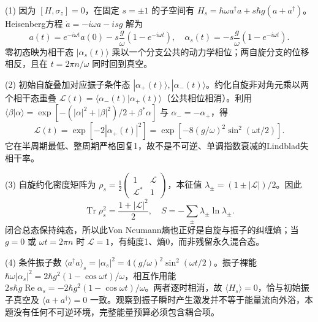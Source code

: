 (1) 因为 \([H,\sigma_z]=0\)，在固定 \(s=\pm1\) 的子空间有 \(H_s=\hbar\omega a^\dagger a+s\hbar g(a+a^\dagger)\)。Heisenberg方程 \(\dot a=-i\omega a-isg\) 解为
\[
a(t)=e^{-i\omega t}a(0)-s\frac g\omega(1-e^{-i\omega t}),
\quad\boxed{\alpha_s(t)=-s\frac g\omega(1-e^{-i\omega t})}.
\]
零初态映为相干态 \(|\alpha_s(t)\rangle\) 乘以一个分支公共的动力学相位；两自旋分支的位移相反，且在 \(t=2\pi n/\omega\) 同时回到真空。

(2) 初始自旋叠加对应振子条件态 \(|\alpha_+(t)\rangle,|\alpha_-(t)\rangle\)。约化自旋非对角元乘以两个相干态重叠 \(\mathcal L(t)=\langle\alpha_-(t)|\alpha_+(t)\rangle\)（公共相位相消）。利用 \(\langle\beta|\alpha\rangle=\exp[-(|\alpha|^2+|\beta|^2)/2+\beta^*\alpha]\) 与 \(\alpha_-=-\alpha_+\)，得
\[
\boxed{\mathcal L(t)=\exp[-2|\alpha_+(t)|^2]
=\exp[-8(g/\omega)^2\sin^2(\omega t/2)]}.
\]
它在半周期最低、整周期严格回复1，故不是不可逆、单调指数衰减的Lindblad失相干率。

(3) 自旋约化密度矩阵为 \(\rho_s=\frac12\begin{pmatrix}1&\mathcal L\\\mathcal L^*&1\end{pmatrix}\)，本征值 \(\lambda_\pm=(1\pm|\mathcal L|)/2\)。因此
\[
\operatorname{Tr}\rho_s^2=\frac{1+|\mathcal L|^2}{2},\quad
S=-\sum_\pm\lambda_\pm\ln\lambda_\pm.
\]
闭合总态保持纯态，所以此Von Neumann熵也正好是自旋与振子的纠缠熵；当 \(g=0\) 或 \(\omega t=2\pi n\) 时 \(\mathcal L=1\)，有纯度1、熵0，而非残留永久混合态。

(4) 条件振子数 \(\langle a^\dagger a\rangle_s=|\alpha_s|^2=4(g/\omega)^2\sin^2(\omega t/2)\)。振子裸能 \(\hbar\omega|\alpha_s|^2=2\hbar g^2(1-\cos\omega t)/\omega\)，相互作用能 \(2s\hbar g\operatorname{Re}\alpha_s=-2\hbar g^2(1-\cos\omega t)/\omega\)。两者逐时相消，故 \(\langle H_s\rangle=0\)，恰与初始振子真空及 \(\langle a+a^\dagger\rangle=0\) 一致。观察到振子瞬时产生激发并不等于能量流向外浴，本题没有任何不可逆环境，完整能量预算必须包含耦合项。
